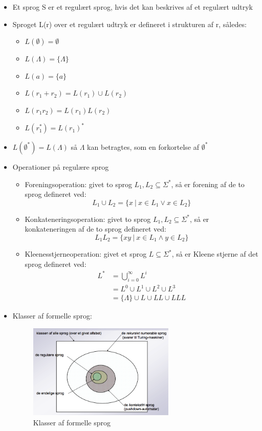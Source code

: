 \documentclass[a4, danish]{article}
\begin{document}
  \begin{itemize}
    \item Et sprog S er et regulært sprog, hvis det kan beskrives af et regulært udtryk
    \item Sproget L(r) over et regulært udtryk er defineret i strukturen af r, således: 
    \begin{itemize}
      \item $L(\emptyset)=\emptyset $
      \item $L(\Lambda)=\{ \Lambda \}$
      \item $L(a)=\{a\}$
      \item $L(r_1+r_2)=L(r_1)\cup L(r_2)$
      \item $L(r_1r_2)=L(r_1)L(r_2)$
      \item $L(r_1^*)=L(r_1)^*$
    \end{itemize}
    \item $L(\emptyset^*)=L(\Lambda)$ så $\Lambda$ kan betragtes, som en forkortelse af $\emptyset^*$
    \item Operationer på regulære sprog
    \begin{itemize}
	    \item Foreningsoperation: givet to sprog $L_1,L_2\subseteq \Sigma^*$, så er forening af de to sprog defineret ved:
      \begin{equation*}
        L_1\cup L_2 = \{x \ | \ x\in L_1 \lor x\in L_2 \}
      \end{equation*}
      \item Konkateneringsoperation: givet to sprog $L_1,L_2\subseteq \Sigma^*$, så er konkateneringen af de to sprog defineret ved:
      \begin{equation*}
        L_1L_2= \{xy \ | \ x\in L_1 \land y\in L_2 \}
       \end{equation*}
      \item Kleenesstjerneoperation: givet et sprog $L \subseteq \Sigma^*$, så er Kleene stjerne af det sprog defineret ved:
      \begin{align*}
        L^* &= \bigcup_{i=0}^{\infty} L^i \\
            &= L^0\cup L^1 \cup L^2 \cup L^3  \\
            &= \{\Lambda \} \cup L \cup LL \cup LLL 
      \end{align*}
    \end{itemize}
    \item Klasser af formelle sprog:
    \begin{figure}[ht!]
	  \centering
	  \includegraphics[width=70mm]{img/sprogklasser.png}
	  \caption{Klasser af formelle sprog	\label{formelleSprog}}
  \end{figure} 
  \end{itemize}
\end{document}
